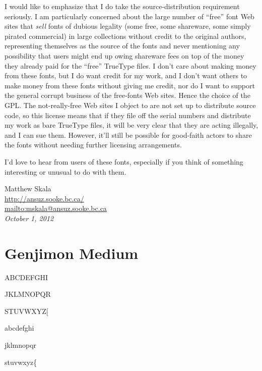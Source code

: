 \documentclass[12pt]{article}
\begin{document}
I would like to emphasize that I do take the source-distribution
requirement seriously.  I am particularly concerned about the large number
of ``free'' font Web sites that \emph{sell} fonts of dubious legality (some
free, some shareware, some simply pirated commercial) in large collections
without credit to the original authors, representing themselves as the
source of the fonts and never mentioning any possibility that users might
end up owing shareware fees on top of the money they already paid for the
``free'' TrueType files.  I don't care about making money from these fonts,
but I do want credit for my work, and I don't want others to make money from
these fonts without giving me credit, nor do I want to support the general
corrupt business of the free-fonts Web sites. Hence the choice of the GPL. 
The not-really-free Web sites I object to are not set up to distribute
source code, so this license means that if they file off the serial numbers
and distribute my work as bare TrueType files, it will be very clear that
they are acting illegally, and I can sue them.  However, it'll still be
possible for good-faith actors to share the fonts without needing further
licensing arrangements.

I'd love to hear from users of these fonts, especially if you think of
something interesting or unusual to do with them.

\vspace{\baselineskip}

\noindent Matthew Skala\\
\url{http://ansuz.sooke.bc.ca/}\\
\url{mailto:mskala@ansuz.sooke.bc.ca}\\
\textit{October 1, 2012}

\clearpage

\setlength{\parindent}{0pt}
\setlength{\parskip}{\baselineskip}


\section{Genjimon Medium}

{
ABCDEFGHI

JKLMNOPQR

STUVWXYZ[

abcdefghi

jklmnopqr

stuvwxyz\{}
\end{document}
